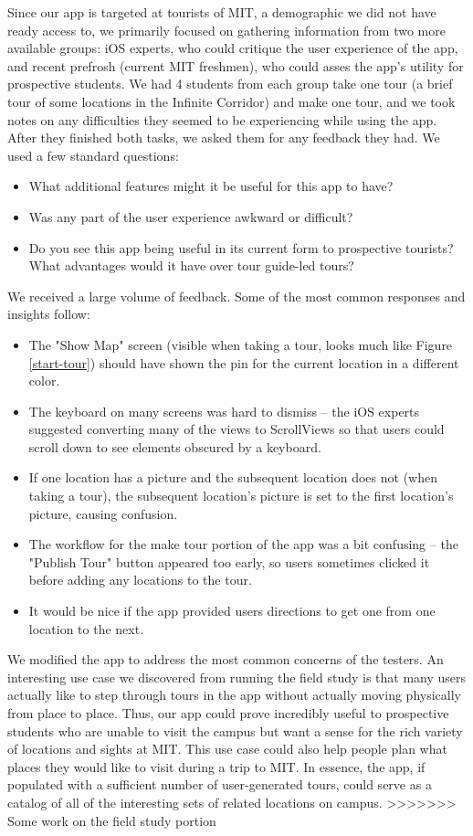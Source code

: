\documentclass{sigchi}
\begin{document}
Since our app is targeted at tourists of MIT, a demographic we did not have ready access to, we primarily focused on gathering information from two more available groups: iOS experts, who could critique the user experience of the app, and recent prefrosh (current MIT freshmen), who could asses the app's utility for prospective students. We had 4 students from each group take one tour (a brief tour of some locations in the Infinite Corridor) and make one tour, and we took notes on any difficulties they seemed to be experiencing while using the app. After they finished both tasks, we asked them for any feedback they had. We used a few standard questions:
\begin{itemize}
\item What additional features might it be useful for this app to have?
\item Was any part of the user experience awkward or difficult?
\item Do you see this app being useful in its current form to prospective tourists? What advantages would it have over tour guide-led tours?
\end{itemize}
We received a large volume of feedback. Some of the most common responses and insights follow:
\begin{itemize}
\item The "Show Map" screen (visible when taking a tour, looks much like Figure \ref{start-tour}) should have shown the pin for the current location in a different color.
\item The keyboard on many screens was hard to dismiss -- the iOS experts suggested converting many of the views to ScrollViews so that users could scroll down to see elements obscured by a keyboard.
\item If one location has a picture and the subsequent location does not (when taking a tour), the subsequent location's picture is set to the first location's picture, causing confusion.
\item The workflow for the make tour portion of the app was a bit confusing -- the "Publish Tour" button appeared too early, so users sometimes clicked it before adding any locations to the tour.
\item It would be nice if the app provided users directions to get one from one location to the next.
\end{itemize}
We modified the app to address the most common concerns of the testers. An interesting use case we discovered from running the field study is that many users actually like to step through tours in the app without actually moving physically from place to place. Thus, our app could prove incredibly useful to prospective students who are unable to visit the campus but want a sense for the rich variety of locations and sights at MIT. This use case could also help people plan what places they would like to visit during a trip to MIT. In essence, the app, if populated with a sufficient number of user-generated tours, could serve as a catalog of all of the interesting sets of related locations on campus.
>>>>>>> Some work on the field study portion
\end{document}

